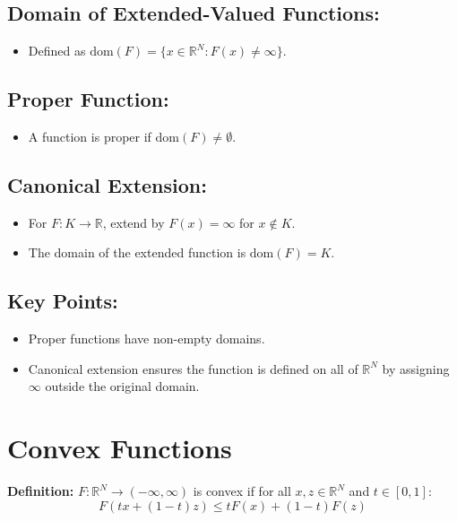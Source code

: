 \documentclass{article}
\begin{document}
\subsection*{Domain of Extended-Valued Functions:}

\begin{itemize}
    \item Defined as $\text{dom}(F) = \{x \in \mathbb{R}^N : F(x) \neq \infty\}$.
\end{itemize}

\subsection*{Proper Function:}

\begin{itemize}
    \item A function is proper if $\text{dom}(F) \neq \emptyset$.
\end{itemize}

\subsection*{Canonical Extension:}

\begin{itemize}
    \item For $F : K \to \mathbb{R}$, extend by $F(x) = \infty$ for $x \notin K$.
    \item The domain of the extended function is $\text{dom}(F) = K$.
\end{itemize}

\subsection*{Key Points:}

\begin{itemize}
    \item Proper functions have non-empty domains.
    \item Canonical extension ensures the function is defined on all of $\mathbb{R}^N$ by assigning $\infty$ outside the original domain.
\end{itemize}




\section*{Convex Functions}

\textbf{Definition:} \( F : \mathbb{R}^N \to (-\infty, \infty) \) is convex if for all \( x, z \in \mathbb{R}^N \) and \( t \in [0, 1] \):
\[
F(tx + (1 - t)z) \leq tF(x) + (1 - t)F(z)
\]
\end{document}
